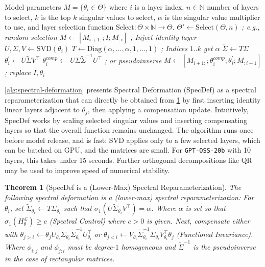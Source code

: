 \documentclass{article}
\theoremstyle{plain}
\newtheorem{theorem}{Theorem}
\theoremstyle{definition}
\theoremstyle{remark}
\begin{document}
\begin{algorithm}[tb]
\caption{Spectral Deformation (SpecDef)}
\begin{algorithmic}[1]
    \STATE Model parameters \(M = \{ \theta_i \in \Theta \}\) where $i$ is a layer index, $n \in \mathbb{N}$ number of layers to select, $k$ is the top $k$ singular values to select, $\alpha$ is the singular value multiplier to use, and layer selection function $\text{Select}: \Theta \times \mathbb{N} \to \Theta$.
    \STATE \(\Theta' \gets \text{Select}(\Theta, n)\) \textit{; e.g., random selection}
        \STATE $M \gets \left[M_{i+1:}; I; M_{:i}\right]$ \textit{; Inject identity layer}
        \STATE \(U, \Sigma, V \gets \text{SVD}(\theta_i)\)
        \STATE \(T \gets \mathrm{Diag}(\alpha, \ldots, \alpha, 1, \ldots, 1)\) \textit{; Indices $1..k$ get $\alpha$}
        \STATE \(\widetilde{\Sigma} \gets T\Sigma\)
        \STATE \(\theta_i^{\prime} \gets U\widetilde{\Sigma}V^{\top}\)
        \STATE \(\theta_i^{comp} \gets \,U \Sigma \widetilde{\Sigma}^{-1} U^{\top}\) \textit{; or pseudoinverse}
        \STATE $M \gets \left[M_{i+1:}; \theta_i^{comp};\theta_i^{\prime}; M_{:i-1}\right]$ \textit{; replace $I,\theta_i$}
    \ENDFOR
\end{algorithmic}
\label{alg:spectral-deformation}
\end{algorithm}

\cref{alg:spectral-deformation} presents Spectral Deformation (SpecDef) as a spectral reparameterization that can directly be obtained from \cref{thm:spectral-deformation-is-spec-reparam-main} by first inserting identity linear layers adjacent to $\theta_j$, then applying a compensation update. Intuitively, SpecDef works by scaling selected singular values and inserting compensating layers so that the overall function remains unchanged. The algorithm runs once before model release, and is fast: SVD applies only to a few selected layers, which can be batched on GPU, and the matrices are small. For \texttt{GPT-OSS-20b} with 10 layers, this takes under 15 seconds. Further orthogonal decompositions like QR may be used to improve speed of numerical stability.

\begin{theorem}[SpecDef is a (Lower-Max) Spectral Reparameterization]
\label{thm:spectral-deformation-is-spec-reparam-main}
The following spectral deformation is a (lower-max) spectral reparameterization:
For $\theta_i$, set $\widetilde{\Sigma}_{\theta_i} \leftarrow T\Sigma_{\theta_i}$ such that $\sigma_1(U\widetilde{\Sigma}_{\theta_i}V^{\top}) = \alpha$. Where $\alpha$ is set so that $\sigma_1(H_{\theta}^{\mathcal{L}}) \geq c$ (Spectral Control) where $c > 0$ is given. Next, compensate either with $\theta_{j>i} \leftarrow \theta_j U_{\theta_i} \Sigma_{\theta_i} \widetilde{\Sigma}_{\theta_i}^{-1} U^{\top}_{\theta_i}$ or $\theta_{j<i} \leftarrow V_{\theta_i}\widetilde{\Sigma}^{-1}_{\theta_i} \Sigma_{\theta_i} V^{\top}_{\theta_i} \theta_j$ (Functional Invariance). Where $\phi_{i:j}$ and $\phi_{j:i}$ must be degree-$1$ homogeneous and $\widetilde{\Sigma}^{-1}$ is the pseudoinverse in the case of rectangular matrices.
\end{theorem}
\end{document}
